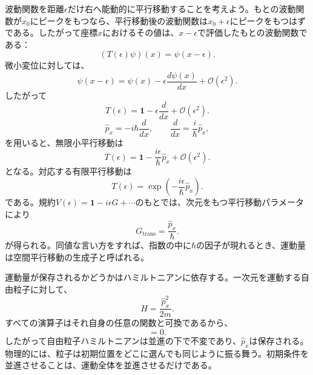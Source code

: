 波動関数を距離\(\epsilon\)だけ右へ能動的に平行移動することを考えよう。もとの波動関数が\(x_0\)にピークをもつなら、平行移動後の波動関数は\(x_0+\epsilon\)にピークをもつはずである。したがって座標\(x\)におけるその値は、\(x-\epsilon\)で評価したもとの波動関数である：
\begin{equation}
(T(\epsilon)\psi)(x)=\psi(x-\epsilon).
\end{equation}
微小変位に対しては、
\begin{equation}
\psi(x-\epsilon)
=
\psi(x)-\epsilon\frac{d\psi(x)}{dx}
+\mathcal O(\epsilon^2).
\end{equation}
したがって
\begin{equation}
T(\epsilon)
=
\mathbf 1-\epsilon\frac{d}{dx}
+\mathcal O(\epsilon^2).
\end{equation}
\begin{equation}
\hat p_x=-i\hbar\frac{d}{dx},
\qquad
\frac{d}{dx}=\frac{i}{\hbar}\hat p_x,
\end{equation}
を用いると、無限小平行移動は
\begin{equation}
T(\epsilon)
=
\mathbf 1-\frac{i\epsilon}{\hbar}\hat p_x
+\mathcal O(\epsilon^2).
\end{equation}
となる。対応する有限平行移動は
\begin{equation}
T(\epsilon)
=
\exp\left(-\frac{i\epsilon}{\hbar}\hat p_x\right).
\end{equation}
である。規約\(V(\epsilon)=\mathbf 1-i\epsilon G+\cdots\)のもとでは、次元をもつ平行移動パラメータにより
\begin{equation}
G_{\mathrm{trans}}=\frac{\hat p_x}{\hbar}.
\end{equation}
が得られる。同値な言い方をすれば、指数の中に\(\hbar\)の因子が現れるとき、運動量は空間平行移動の生成子と呼ばれる。

\begin{classroomqa}
\end{classroomqa}

運動量が保存されるかどうかはハミルトニアンに依存する。一次元を運動する自由粒子に対して、
\begin{equation}
H=\frac{\hat p_x^2}{2m}.
\end{equation}
すべての演算子はそれ自身の任意の関数と可換であるから、
\begin{equation}
[H,\hat p_x]=0.
\end{equation}
したがって自由粒子ハミルトニアンは並進の下で不変であり、\(\hat p_x\)は保存される。物理的には、粒子は初期位置をどこに選んでも同じように振る舞う。初期条件を並進させることは、運動全体を並進させるだけである。

